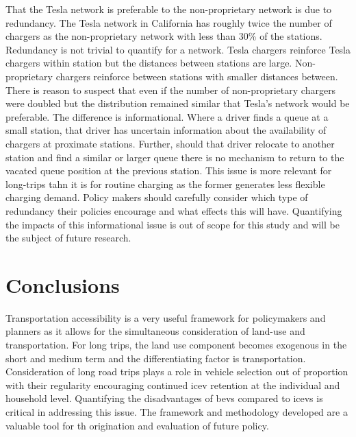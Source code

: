 \documentclass[11pt]{article}
\begin{document}
\begin{multicols}{2}
That the Tesla network is preferable to the non-proprietary network is due to redundancy. The Tesla network in California has roughly twice the number of chargers as the non-proprietary network with less than 30\% of the stations. Redundancy is not trivial to quantify for a network. Tesla chargers reinforce Tesla chargers within station but the distances between stations are large. Non-proprietary chargers reinforce between stations with smaller distances between. There is reason to suspect that even if the number of non-proprietary chargers were doubled but the distribution remained similar that Tesla's network would be preferable. The difference is informational. Where a driver finds a queue at a small station, that driver has uncertain information about the availability of chargers at proximate stations. Further, should that driver relocate to another station and find a similar or larger queue there is no mechanism to return to the vacated queue position at the previous station. This issue is more relevant for long-trips tahn it is for routine charging as the former generates less flexible charging demand. Policy makers should carefully consider which type of redundancy their policies encourage and what effects this will have. Quantifying the impacts of this informational issue is out of scope for this study and will be the subject of future research.

\section*{Conclusions}

Transportation accessibility is a very useful framework for policymakers and planners as it allows for the simultaneous consideration of land-use and transportation. For long trips, the land use component becomes exogenous in the short and medium term and the differentiating factor is transportation. Consideration of long road trips plays a role in vehicle selection out of proportion with their regularity encouraging continued \gls{icev} retention at the individual and household level. Quantifying the disadvantages of \glspl{bev} compared to \glspl{icev} is critical in addressing this issue. The framework and methodology developed are a valuable tool for th origination and evaluation of future policy.


\end{multicols}
\end{document}
